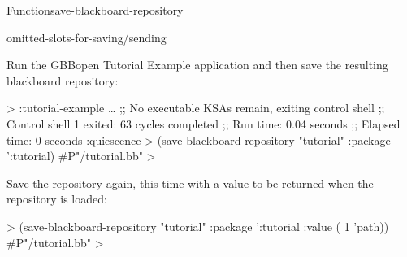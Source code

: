 \documentclass[10pt,twoside,english,pdftex]{article}
\begin{document}
\begin{functiondoc}{Function}{save-blackboard-repository}
\begin{alsos}{omitted-slots-for-saving/sending}
\end{alsos}

\fnexample Run the GBBopen Tutorial Example application and then save the
resulting blackboard repository:
%
\W\supp
\begin{example}
  > :tutorial-example
      \textrm{\ldots{}}
  ;; No executable KSAs remain, exiting control shell
  ;; Control shell 1 exited: 63 cycles completed
  ;; Run time: 0.04 seconds
  ;; Elapsed time: 0 seconds
  :quiescence
  > (save-blackboard-repository "tutorial" :package ':tutorial)
  #P"/tutorial.bb"
  >
\end{example}
Save the repository again, this time with a value to be returned when the
repository is loaded:
%
%
%
\W\supp\notpretop
\begin{example}
  > (save-blackboard-repository "tutorial" 
      :package ':tutorial
      :value ( 1 'path))
  #P"/tutorial.bb"
  >
\end{example}

\end{functiondoc}

\end{document}
